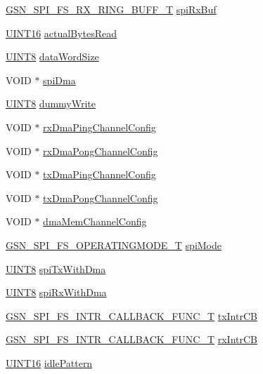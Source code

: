 \begin{DoxyCompactItemize}
\item 
\hyperlink{a00236}{GSN\_\-SPI\_\-FS\_\-RX\_\-RING\_\-BUFF\_\-T} \hyperlink{a00232_a7994f434c68cbf93b45175a28d5e5a17}{spiRxBuf}
\item 
\hyperlink{a00660_ga09f1a1fb2293e33483cc8d44aefb1eb1}{UINT16} \hyperlink{a00232_aa458a81c4cc5863c64abf7dac4d6a497}{actualBytesRead}
\item 
\hyperlink{a00660_gab27e9918b538ce9d8ca692479b375b6a}{UINT8} \hyperlink{a00232_ad3c2f2d6e4146b01aa1dd5ba2745ce46}{dataWordSize}
\item 
VOID $\ast$ \hyperlink{a00232_ab08af989c36bfccd7ef415ab4723fec7}{spiDma}
\item 
\hyperlink{a00660_gab27e9918b538ce9d8ca692479b375b6a}{UINT8} \hyperlink{a00232_abdf3222930534e618e383d4015985ecf}{dummyWrite}
\item 
VOID $\ast$ \hyperlink{a00232_ab10b1874804481103b375718a1788144}{rxDmaPingChannelConfig}
\item 
VOID $\ast$ \hyperlink{a00232_aa2733539030c490c8bc19d5ea2185f4a}{rxDmaPongChannelConfig}
\item 
VOID $\ast$ \hyperlink{a00232_aa0e5ef8888315014132a72402c5c8ba6}{txDmaPingChannelConfig}
\item 
VOID $\ast$ \hyperlink{a00232_a547f76d857761154a931bf0fd0f0a4ee}{txDmaPongChannelConfig}
\item 
VOID $\ast$ \hyperlink{a00232_a4ceeab023e36f53fe50f6ab4a197961d}{dmaMemChannelConfig}
\item 
\hyperlink{a00655_gab173e44df6afa7f56b96f3a05cb857a5}{GSN\_\-SPI\_\-FS\_\-OPERATINGMODE\_\-T} \hyperlink{a00232_a222e972463285c6028dbe0b209416401}{spiMode}
\item 
\hyperlink{a00660_gab27e9918b538ce9d8ca692479b375b6a}{UINT8} \hyperlink{a00232_a22c3c622b95eb6c2344e62fcd5ebc0bf}{spiTxWithDma}
\item 
\hyperlink{a00660_gab27e9918b538ce9d8ca692479b375b6a}{UINT8} \hyperlink{a00232_a916c13efb27c773a6adcc6129fb9be8e}{spiRxWithDma}
\item 
\hyperlink{a00655_gaccc2e6d52833a5b6d9bbdd2506521d89}{GSN\_\-SPI\_\-FS\_\-INTR\_\-CALLBACK\_\-FUNC\_\-T} \hyperlink{a00232_a6325a4c01ac28ef24556da869462013f}{txIntrCB}
\item 
\hyperlink{a00655_gaccc2e6d52833a5b6d9bbdd2506521d89}{GSN\_\-SPI\_\-FS\_\-INTR\_\-CALLBACK\_\-FUNC\_\-T} \hyperlink{a00232_aec97c6dc1aa53452aa2e39aa1f1ff89f}{rxIntrCB}
\item 
\hyperlink{a00660_ga09f1a1fb2293e33483cc8d44aefb1eb1}{UINT16} \hyperlink{a00232_a66c4a026b5acb2b1b2974040b6936298}{idlePattern}

\end{DoxyCompactItemize}
